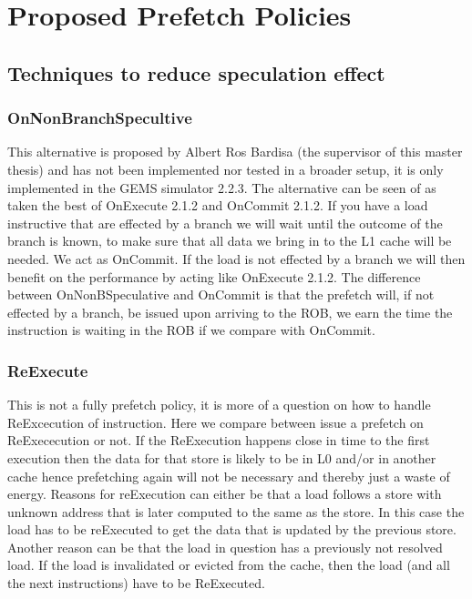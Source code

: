 \chapter{Proposed Prefetch Policies}
\label{chap:ProposedPrefetchPolicies}

\section{Techniques to reduce speculation effect} 

\subsection{OnNonBranchSpecultive}
This alternative is proposed by Albert Ros Bardisa (the supervisor of this master
thesis) and has not been implemented nor tested in a broader setup, it is only implemented in the GEMS simulator 2.2.3. \fixme The alternative can be seen of as taken the
best of OnExecute 2.1.2 \fixme and OnCommit 2.1.2. \fixme If you have a load instructive that are
effected by a branch we will wait until the outcome of the branch is known, to make
sure that all data we bring in to the L1 cache will be needed. We act as OnCommit. If
the load is not effected by a branch we will then benefit on the performance by acting
like OnExecute 2.1.2. \fixme The difference between OnNonBSpeculative and OnCommit
is that the prefetch will, if not effected by a branch, be issued upon arriving to the
ROB, we earn the time the instruction is waiting in the ROB if we compare with
OnCommit.
\subsection{ReExecute}
This is not a fully prefetch policy, it is more of a question on how to handle ReExcecution of instruction. Here we compare between issue a prefetch on ReExececution
or not. If the ReExecution happens close in time to the first execution then the data
for that store is likely to be in L0 and/or in another cache hence prefetching again
will not be necessary and thereby just a waste of energy. Reasons for reExecution can
either be that a load follows a store with unknown address that is later computed to
the same as the store. In this case the load has to be reExecuted to get the data that
is updated by the previous store. Another reason can be that the load in question has
a previously not resolved load. If the load is invalidated or evicted from the cache,
then the load (and all the next instructions) have to be ReExecuted.

